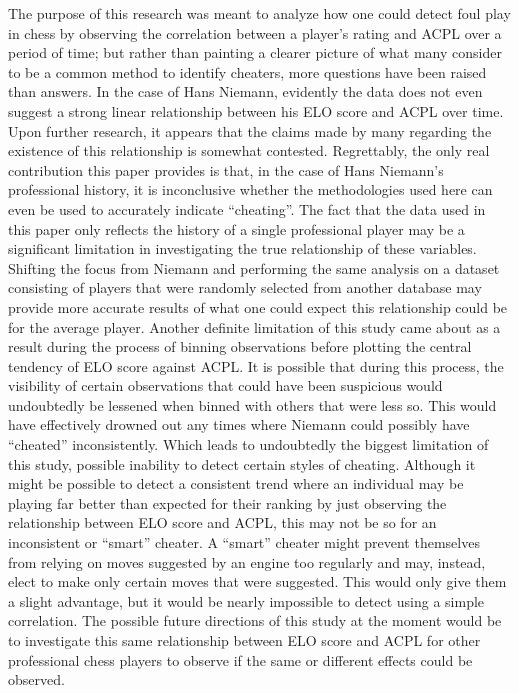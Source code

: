 \documentclass[12pt, letterpaper, titlepage]{article}
\begin{document}
The purpose of this research was meant to analyze how one could detect foul play in chess by observing the correlation between a player's rating and ACPL over a period of time; but rather than painting a clearer picture of what many consider to be a common method to identify cheaters, more questions have been raised than answers. In the case of Hans Niemann, evidently the data does not even suggest a strong linear relationship between his ELO score and ACPL over time. Upon further research, it appears that the claims made by many regarding the existence of this relationship is somewhat contested. Regrettably, the only real contribution this paper provides is that, in the case of Hans Niemann's professional history, it is inconclusive whether the methodologies used here can even be used to accurately indicate “cheating”. The fact that the data used in this paper only reflects the history of a single professional player may be a significant limitation in investigating the true relationship of these variables. Shifting the focus from Niemann and performing the same analysis on a dataset consisting of players that were randomly selected from another database may provide more accurate results of what one could expect this relationship could be for the average player. Another definite limitation of this study came about as a result during the process of binning observations before plotting the central tendency of ELO score against ACPL. It is possible that during this process, the visibility of certain observations that could have been suspicious would undoubtedly be lessened when binned with others that were less so. This would have effectively drowned out any times where Niemann could possibly have “cheated” inconsistently. Which leads to undoubtedly the biggest limitation of this study, possible inability to detect certain styles of cheating. Although it might be possible to detect a consistent trend where an individual may be playing far better than expected for their ranking by just observing the relationship between ELO score and ACPL, this may not be so for an inconsistent or “smart” cheater. A “smart” cheater might prevent themselves from relying on moves suggested by an engine too regularly and may, instead, elect to make only certain moves that were suggested. This would only give them a slight advantage, but it would be nearly impossible to detect using a simple correlation. The possible future directions of this study at the moment would be to investigate this same relationship between ELO score and ACPL for other professional chess players to observe if the same or different effects could be observed.
\end{document}
